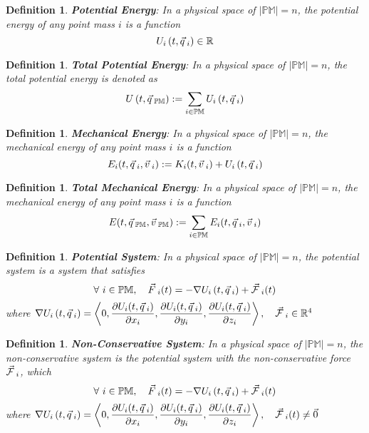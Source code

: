 \documentclass[12pt]{amsart}
\newtheorem{definition}[theorem]{Definition}
\let\oldvec\vec
\renewcommand{\vec}[1]{\oldvec{#1}\hspace{0.1em}}
\begin{document}
\begin{definition}
    \textbf{Potential Energy}: In a physical space of $\left | \mathbb{PM} \right | = n$, the potential energy of any point mass $i$ is a function $$  U_i \left ( t, \vec{q}_i \right ) \in \mathbb{R} $$
\end{definition}

\begin{definition}
    \textbf{Total Potential Energy}: In a physical space of $\left | \mathbb{PM} \right | = n$, the total potential energy is denoted as $$U\left ( t, \vec{q}_\mathbb{PM} \right ) := \sum_{i \in \mathbb{PM}}  U_i \left ( t, \vec{q}_i \right )  $$
\end{definition}

\begin{definition}
    \textbf{Mechanical Energy}: In a physical space of $\left | \mathbb{PM} \right | = n$, the mechanical energy of any point mass $i$ is a function $$E_i(t, \vec{q}_i, \vec{v}_i) := K_i (t, \vec{v}_i) +  U_i \left ( t, \vec{q}_i \right )$$
\end{definition}

\begin{definition}
    \textbf{Total Mechanical Energy}: In a physical space of $\left | \mathbb{PM} \right | = n$, the mechanical energy of any point mass $i$ is a function $$E(t, \vec{q}_\mathbb{PM}, \vec{v}_\mathbb{PM}) := \sum_{i \in \mathbb{PM}} E_i(t, \vec{q}_i, \vec{v}_i)$$
\end{definition}

\begin{definition}
    \textbf{Potential System}: In a physical space of $\left | \mathbb{PM} \right | = n$, the potential system is a system that satisfies $$\forall \  i \in \mathbb{PM}, \quad \vec{F}_i (t) = - \nabla U_i \left ( t, \vec{q}_i  \right) + \vec{\mathcal{F}}_i(t) $$ where $ \nabla  U_i \left ( t, \vec{q}_i \right )  = \left < 0, \dfrac{\partial U_i (t, \vec{q}_i)}{\partial x_i}, \dfrac{\partial U_i (t, \vec{q}_i)}{\partial y_i}, \dfrac{\partial U_i (t, \vec{q}_i)}{\partial z_i} \right >, \quad \vec{\mathcal{F}}_i \in \mathbb{R}^4 $
\end{definition}


\begin{definition}
    \textbf{Non-Conservative System}: In a physical space of $\left | \mathbb{PM} \right | = n$, the non-conservative system is the potential system with the non-conservative force $\vec{\mathcal{F}}_i$, which $$\forall \  i \in \mathbb{PM}, \quad \vec{F}_i (t) = - \nabla U_i \left ( t, \vec{q}_i  \right) + \vec{\mathcal{F}}_i(t) $$ where $ \nabla  U_i \left ( t, \vec{q}_i \right )  = \left < 0, \dfrac{\partial U_i (t, \vec{q}_i)}{\partial x_i}, \dfrac{\partial U_i (t, \vec{q}_i)}{\partial y_i}, \dfrac{\partial U_i (t, \vec{q}_i)}{\partial z_i} \right >, \quad \vec{\mathcal{F}}_i (t) \ne \vec{0} $
\end{definition}
\end{document}
